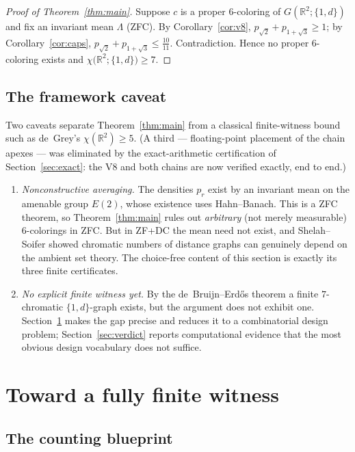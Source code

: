 \documentclass[11pt]{article}
\theoremstyle{definition}
\theoremstyle{remark}
\newcommand{\R}{\mathbb{R}}
\newcommand{\dd}{d}                          %
\newcommand{\chid}[1]{\chi\bigl(\R^2;#1\bigr)}
\begin{document}
\begin{proof}[Proof of Theorem~\ref{thm:main}]
Suppose $c$ is a proper $6$-coloring of $G(\R^2;\{1,\dd\})$ and fix an
invariant mean $\Lambda$ (ZFC).  By Corollary~\ref{cor:v8},
$p_{\sqrt2}+p_{1+\sqrt3}\ge1$; by Corollary~\ref{cor:caps},
$p_{\sqrt2}+p_{1+\sqrt3}\le\tfrac{10}{11}$.  Contradiction.  Hence no
proper $6$-coloring exists and $\chid{\{1,\dd\}}\ge7$.
\end{proof}

\subsection{The framework caveat}\label{sec:caveat}

Two caveats separate Theorem~\ref{thm:main} from a classical
finite-witness bound such as de~Grey's $\chi(\R^2)\ge5$.  (A third ---
floating-point placement of the chain apexes --- was eliminated by the
exact-arithmetic certification of Section~\ref{sec:exact}: the V8 and
both chains are now verified exactly, end to end.)

\begin{enumerate}[label=(\roman*)]
\item \emph{Nonconstructive averaging.}  The densities $p_r$ exist by an
invariant mean on the amenable group $E(2)$, whose existence uses
Hahn--Banach.  This is a ZFC theorem, so Theorem~\ref{thm:main} rules
out \emph{arbitrary} (not merely measurable) $6$-colorings in ZFC.  But
in ZF+DC the mean need not exist, and Shelah--Soifer
\cite{ShelahSoifer03} showed chromatic numbers of distance graphs can
genuinely depend on the ambient set theory.  The choice-free content of
this section is exactly its three finite certificates.
\item \emph{No explicit finite witness yet.}  By the de~Bruijn--Erd\H{o}s
theorem a finite $7$-chromatic $\{1,\dd\}$-graph exists, but the argument
does not exhibit one.  Section~\ref{sec:blueprint} makes the
gap precise and reduces it to a combinatorial design problem;
Section~\ref{sec:verdict} reports computational evidence that the most
obvious design vocabulary does not suffice.
\end{enumerate}

\section{Toward a fully finite witness}\label{sec:blueprint}

\subsection{The counting blueprint}
\end{document}
